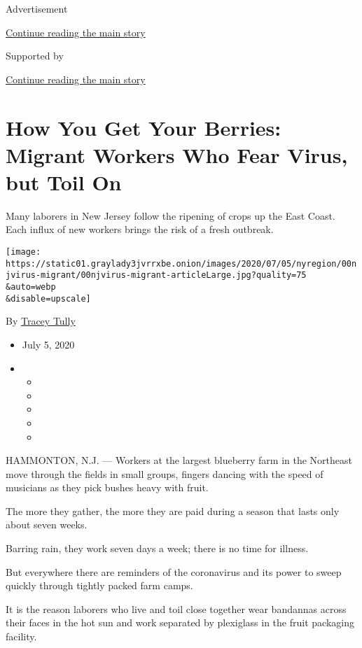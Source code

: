 Advertisement

\protect\hyperlink{after-top}{Continue reading the main story}

Supported by

\protect\hyperlink{after-sponsor}{Continue reading the main story}

\hypertarget{how-you-get-your-berries-migrant-workers-who-fear-virus-but-toil-on}{%
\section{How You Get Your Berries: Migrant Workers Who Fear Virus, but
Toil
On}\label{how-you-get-your-berries-migrant-workers-who-fear-virus-but-toil-on}}

Many laborers in New Jersey follow the ripening of crops up the East
Coast. Each influx of new workers brings the risk of a fresh outbreak.

\texttt{[image: https://static01.graylady3jvrrxbe.onion/images/2020/07/05/nyregion/00njvirus-migrant/00njvirus-migrant-articleLarge.jpg?quality=75\\\&auto=webp\\\&disable=upscale]}

By \href{https://www.nytimes3xbfgragh.onion/by/tracey-tully}{Tracey
Tully}

\begin{itemize}
\item
  July 5, 2020
\item
  \begin{itemize}
  \item
  \item
  \item
  \item
  \item
  \end{itemize}
\end{itemize}

HAMMONTON, N.J. --- Workers at the largest blueberry farm in the
Northeast move through the fields in small groups, fingers dancing with
the speed of musicians as they pick bushes heavy with fruit.

The more they gather, the more they are paid during a season that lasts
only about seven weeks.

Barring rain, they work seven days a week; there is no time for illness.

But everywhere there are reminders of the coronavirus and its power to
sweep quickly through tightly packed farm camps.

It is the reason laborers who live and toil close together wear
bandannas across their faces in the hot sun and work separated by
plexiglass in the fruit packaging facility.

